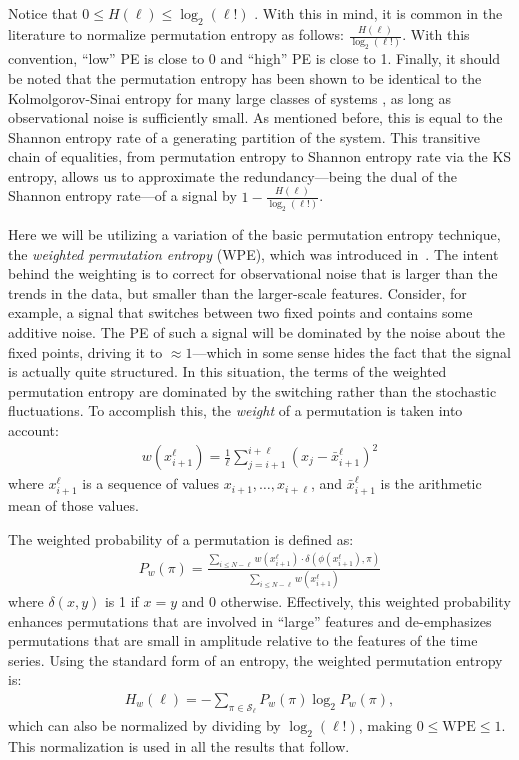 Notice that $0\le H(\ell) \le \log_2(\ell!)$ \cite{bandt2002per}.
With this in mind, it is common in the literature to normalize
permutation entropy as follows: $\frac{H(\ell)}{\log_2(\ell!)}$.  With
this convention, ``low'' PE is close to 0 and ``high'' PE is close to
1. Finally, it should be noted that the permutation entropy has been
shown to be identical to the Kolmolgorov-Sinai entropy for many large
classes of systems \cite{amigo2012permutation}, as long as
observational noise is sufficiently small. As mentioned before, this
is equal to the Shannon entropy rate of a generating partition of the
system. This transitive chain of equalities, from permutation entropy
to Shannon entropy rate via the KS entropy, allows us to approximate
the redundancy---being the dual of the Shannon entropy rate---of a
signal by $1 - \frac{H(\ell)}{\log_2(\ell!)}$.

Here we will be utilizing a variation of the basic permutation entropy
technique, the \emph{weighted permutation entropy} (WPE), which was
introduced in~\cite{fadlallah2013}.  The intent behind the weighting
is to correct for observational noise that is larger than the trends
in the data, but smaller than the larger-scale features.  Consider,
for example, a signal that switches between two fixed points and
contains some additive noise. The PE of such a signal will be
dominated by the noise about the fixed points, driving it to $\approx
1$---which in some sense hides the fact that the signal is actually
quite structured.  In this situation, the terms of the weighted
permutation entropy are dominated by the switching rather than the
stochastic fluctuations. To accomplish this, the \emph{weight} of a
permutation is taken into account:
\begin{align*}
  w(x_{i+1}^\ell) = \frac{1}{\ell} \sum_{j = i + 1}^{i+\ell}
                      \left( x_j - \bar{x}_{i+1}^\ell \right)^2
\end{align*}
where $x_{i+1}^\ell$ is a sequence of values $x_{i+1}, \ldots,
x_{i+\ell}$, and $\bar{x}_{i+1}^\ell$ is the arithmetic mean of
those values.

The weighted probability of a permutation is defined as:
\begin{align*}
  P_w(\pi) = \frac{\displaystyle \sum_{i \le N - \ell} w(x_{i+1}^\ell) \cdot \delta(\phi(x_{i+1}^\ell), \pi) }{\displaystyle \sum_{i \le N - \ell} w(x_{i+1}^\ell)}
\end{align*}
where $\delta(x, y)$ is 1 if $x = y$ and 0 otherwise. Effectively,
this weighted probability enhances permutations that are involved in
``large'' features and de-emphasizes permutations that are small in
amplitude relative to the features of the time series. Using the
standard form of an entropy, the weighted permutation entropy is:
\begin{align*}
  H_w(\ell) = - \sum_{\pi \in \mathcal{S}_\ell} P_w(\pi) \log_2 P_w(\pi),
\end{align*}
which can also be normalized by dividing by $\log_2(\ell!)$, making $0
\le \textrm{WPE} \le 1$.  This normalization is used in all the
results that follow.

